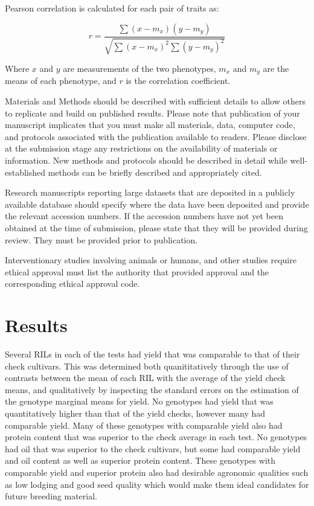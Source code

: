 \documentclass[Agronomy,article,submit,moreauthors,pdftex]{mdpi}
\begin{document}
Pearson correlation is calculated for each pair of traits as:

\[r = \frac{\sum{(x-m_x)(y-m_y)}}{\sqrt{\sum{(x-m_x)^2}\sum{(y-m_y)^2}}}\]

Where \(x\) and \(y\) are measurements of the two phenotypes, \(m_x\)
and \(m_y\) are the means of each phenotype, and \(r\) is the
correlation coefficient.

Materials and Methods should be described with sufficient details to
allow others to replicate and build on published results. Please note
that publication of your manuscript implicates that you must make all
materials, data, computer code, and protocols associated with the
publication available to readers. Please disclose at the submission
stage any restrictions on the availability of materials or information.
New methods and protocols should be described in detail while
well-established methods can be briefly described and appropriately
cited.

Research manuscripts reporting large datasets that are deposited in a
publicly available database should specify where the data have been
deposited and provide the relevant accession numbers. If the accession
numbers have not yet been obtained at the time of submission, please
state that they will be provided during review. They must be provided
prior to publication.

Interventionary studies involving animals or humans, and other studies
require ethical approval must list the authority that provided approval
and the corresponding ethical approval code.

\hypertarget{results}{%
\section{Results}\label{results}}

Several RILs in each of the tests had yield that was comparable to that
of their check cultivars. This was determined both quanititatively
through the use of contrasts between the mean of each RIL with the
average of the yield check means, and qualitatively by inspecting the
standard errors on the estimation of the genotype marginal means for
yield. No genotypes had yield that was quantitatively higher than that
of the yield checks, however many had comparable yield. Many of these
genotypes with comparable yield also had protein content that was
superior to the check average in each test. No genotypes had oil that
was superior to the check cultivars, but some had comparable yield and
oil content as well as superior protein content. These genotypes with
comparable yield and superior protein also had desirable agronomic
qualities such as low lodging and good seed quality which would make
them ideal candidates for future breeding material.
\end{document}
